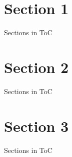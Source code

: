 \documentclass[aspectratio=169, xcolor={x11names}]{beamer}
\begin{document}
\section{Section 1}

\begin{frame}[allowframebreaks=0.9]{Sections in ToC}

\blindtext[3]

\end{frame}

\section{Section 2}

\begin{frame}[allowframebreaks=0.9]{Sections in ToC}

\blindtext[3]

\end{frame}


\section{Section 3}

\begin{frame}[allowframebreaks=0.9]{Sections in ToC}

\blindtext[3]

\end{frame}
\end{document}
